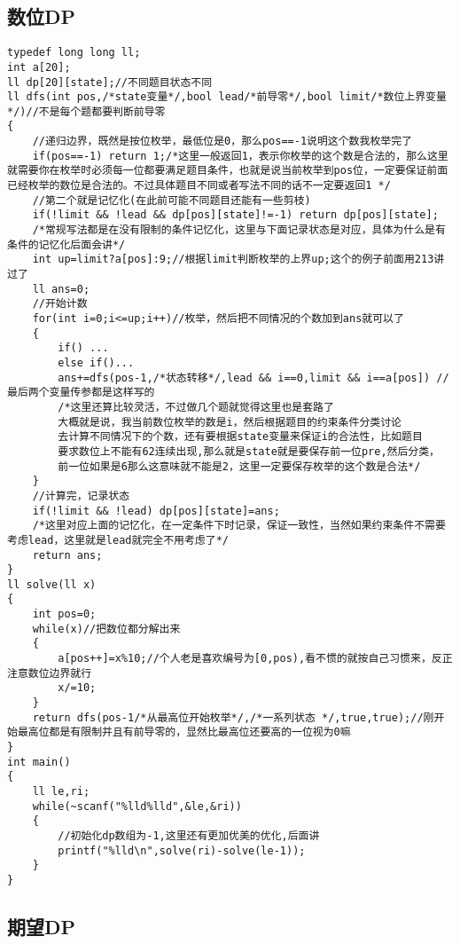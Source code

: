 \documentclass[UTF8]{ctexart}
\begin{document}
\subsection{数位DP}
\begin{lstlisting}
typedef long long ll;
int a[20];
ll dp[20][state];//不同题目状态不同
ll dfs(int pos,/*state变量*/,bool lead/*前导零*/,bool limit/*数位上界变量*/)//不是每个题都要判断前导零
{
    //递归边界，既然是按位枚举，最低位是0，那么pos==-1说明这个数我枚举完了
    if(pos==-1) return 1;/*这里一般返回1，表示你枚举的这个数是合法的，那么这里就需要你在枚举时必须每一位都要满足题目条件，也就是说当前枚举到pos位，一定要保证前面已经枚举的数位是合法的。不过具体题目不同或者写法不同的话不一定要返回1 */
    //第二个就是记忆化(在此前可能不同题目还能有一些剪枝)
    if(!limit && !lead && dp[pos][state]!=-1) return dp[pos][state];
    /*常规写法都是在没有限制的条件记忆化，这里与下面记录状态是对应，具体为什么是有条件的记忆化后面会讲*/
    int up=limit?a[pos]:9;//根据limit判断枚举的上界up;这个的例子前面用213讲过了
    ll ans=0;
    //开始计数
    for(int i=0;i<=up;i++)//枚举，然后把不同情况的个数加到ans就可以了
    {
        if() ...
        else if()...
        ans+=dfs(pos-1,/*状态转移*/,lead && i==0,limit && i==a[pos]) //最后两个变量传参都是这样写的
        /*这里还算比较灵活，不过做几个题就觉得这里也是套路了
        大概就是说，我当前数位枚举的数是i，然后根据题目的约束条件分类讨论
        去计算不同情况下的个数，还有要根据state变量来保证i的合法性，比如题目
        要求数位上不能有62连续出现,那么就是state就是要保存前一位pre,然后分类，
        前一位如果是6那么这意味就不能是2，这里一定要保存枚举的这个数是合法*/
    }
    //计算完，记录状态
    if(!limit && !lead) dp[pos][state]=ans;
    /*这里对应上面的记忆化，在一定条件下时记录，保证一致性，当然如果约束条件不需要考虑lead，这里就是lead就完全不用考虑了*/
    return ans;
}
ll solve(ll x)
{
    int pos=0;
    while(x)//把数位都分解出来
    {
        a[pos++]=x%10;//个人老是喜欢编号为[0,pos),看不惯的就按自己习惯来，反正注意数位边界就行
        x/=10;
    }
    return dfs(pos-1/*从最高位开始枚举*/,/*一系列状态 */,true,true);//刚开始最高位都是有限制并且有前导零的，显然比最高位还要高的一位视为0嘛
}
int main()
{
    ll le,ri;
    while(~scanf("%lld%lld",&le,&ri))
    {
        //初始化dp数组为-1,这里还有更加优美的优化,后面讲
        printf("%lld\n",solve(ri)-solve(le-1));
    }
}  
\end{lstlisting}
\subsection{期望DP}
\end{document}
